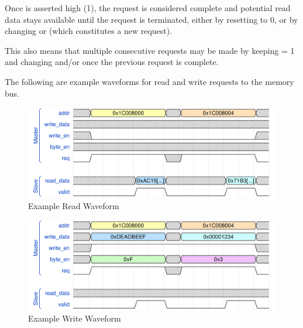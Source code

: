 Once  is asserted high (1), the request is considered complete and potential read data stays available until the request is terminated, either by resetting  to 0, or by changing  or  (which constitutes a new request).

This also means that multiple consecutive requests may be made by keeping  = 1 and changing  and/or  once the previous request is complete.

The following are example waveforms for read and write requests to the memory bus.
\begin{figure}[h!]
    \centering
    \includegraphics[width=\textwidth]{graphics/EduSoC_Bus_Read.svg}
    \vspace{-1em}
    \caption{Example Read Waveform}
    \label{fig:read_waveform}
\end{figure}
\begin{figure}[h!]
    \vspace{1em}
    \centering
    \includegraphics[width=\textwidth]{graphics/EduSoC_Bus_Write.svg}
    \vspace{-1em}
    \caption{Example Write Waveform}
    \label{fig:write_waveform}
\end{figure}

